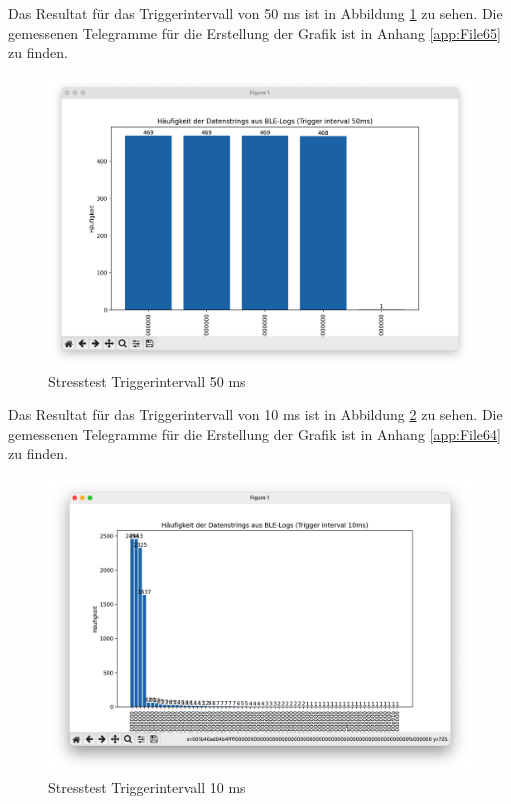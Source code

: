 Das Resultat für das Triggerintervall von 50 ms ist in Abbildung \ref{fig:Stress50} zu sehen. Die gemessenen Telegramme für die Erstellung der Grafik ist in Anhang \ref{app:File65} zu finden.

\begin{figure}[H]
    \centering
    \includegraphics[width=0.9\linewidth]{Figures/Chap4/Stesstest/Stress_50.png}
    \caption{Stresstest Triggerintervall 50 ms}
    \label{fig:Stress50}
\end{figure}

Das Resultat für das Triggerintervall von 10 ms ist in Abbildung \ref{fig:Stress10} zu sehen. Die gemessenen Telegramme für die Erstellung der Grafik ist in Anhang \ref{app:File64} zu finden.

\begin{figure}[H]
    \centering
    \includegraphics[width=0.9\linewidth]{Figures/Chap4/Stesstest/Stress_10.png}
    \caption{Stresstest Triggerintervall 10 ms}
    \label{fig:Stress10}
\end{figure}

